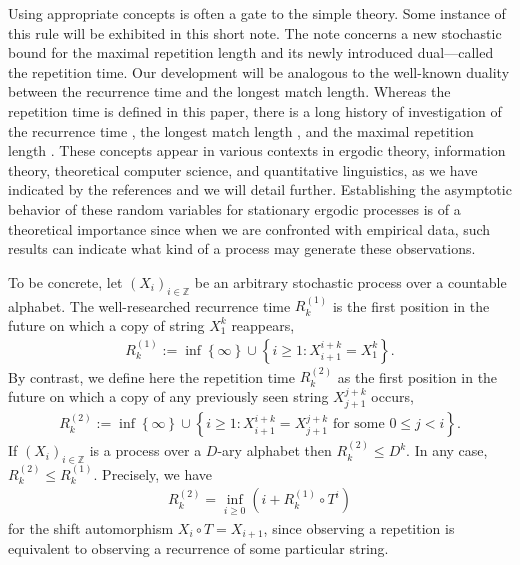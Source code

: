 \documentclass[a4paper,12pt]{article}
\newcommand{\okra}[1]{\left( #1 \right)}
\newcommand{\klam}[1]{\left\{ #1 \right\}}
\begin{document}
Using appropriate concepts is often a gate to the simple theory. Some
instance of this rule will be exhibited in this short note. The note
concerns a new stochastic bound for the maximal repetition length and
its newly introduced dual---called the repetition time.  Our
development will be analogous to the well-known duality between the
recurrence time and the longest match length.  Whereas the repetition
time is defined in this paper, there is a long history of
investigation of the recurrence time
\citep{Kac47,WynerZiv89,OrnsteinWeiss93,Kontoyiannis98,Ko12}, the
longest match length \citep{WynerZiv89,OrnsteinWeiss93,Szpankowski93,
  KontoyiannisOthers98,GaoKontoyiannisBienenstock08}, and the maximal
repetition length
\citep{DeLuca99,KolpakovKucherov99a,KolpakovKucherov99,CrochemoreIlie08,
  ErdosRenyi70,ArratiaWaterman89,Shields92b,Shields97,
  Szpankowski93,Szpankowski93a,KontoyiannisSuhov94,
  Debowski11b,Debowski17,Debowski18b}. These concepts appear in
various contexts in ergodic theory, information theory, theoretical
computer science, and quantitative linguistics, as we have indicated
by the references and we will detail further.  Establishing the
asymptotic behavior of these random variables for stationary ergodic
processes is of a theoretical importance since when we are confronted
with empirical data, such results can indicate what kind of a process
may generate these observations.

To be concrete, let $(X_i)_{i\in\mathbb{Z}}$ be an arbitrary
stochastic process over a countable alphabet. The well-researched
recurrence time $R^{(1)}_k$ is the first position in the future on
which a copy of string $X_1^k$ reappears,
\begin{align}
  R^{(1)}_k:=\inf\klam{\infty}\cup\klam{i\ge 1: X_{i+1}^{i+k}=X_1^k}.
\end{align}
By contrast, we define here the repetition time $R^{(2)}_k$ as the
first position in the future on which a copy of any previously seen
string $X_{j+1}^{j+k}$ occurs,
\begin{align}
  R^{(2)}_k:=\inf\klam{\infty}\cup\klam{i\ge 1:
  X_{i+1}^{i+k}=X_{j+1}^{j+k}\text{ for some } 0\le j<i}.
\end{align}
If $(X_i)_{i\in\mathbb{Z}}$ is a process over a $D$-ary alphabet then
$R^{(2)}_k\le D^k$. In any case, $R^{(2)}_k\le R^{(1)}_k$. Precisely,
we have
\begin{align}
  \label{Minimum}
  R^{(2)}_k=\inf_{i\ge 0}\okra{i+R^{(1)}_k\circ T^i}
\end{align}
for the shift automorphism $X_i\circ T=X_{i+1}$, since observing a
repetition is equivalent to observing a recurrence of some particular
string.
\end{document}
